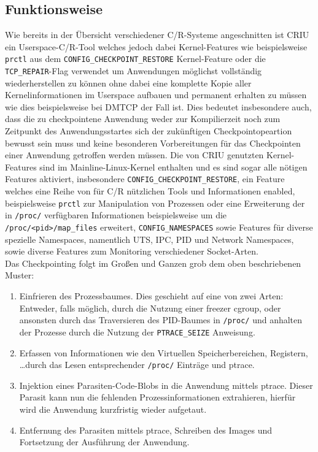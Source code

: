 \documentclass[a4paper]{article}
\begin{document}
\subsection{Funktionsweise}
Wie bereits in der Übersicht verschiedener C/R-Systeme angeschnitten ist CRIU ein Userspace-C/R-Tool welches jedoch dabei Kernel-Features wie beispielsweise \texttt{prctl} aus dem \texttt{CONFIG\_CHECKPOINT\_RESTORE} Kernel-Feature oder die \texttt{TCP\_REPAIR}-Flag verwendet um Anwendungen möglichst vollständig wiederherstellen zu können ohne dabei eine komplette Kopie aller Kernelinformationen im Userspace aufbauen und permanent erhalten zu müssen wie dies beispielsweise bei DMTCP der Fall ist. 
Dies bedeutet insbesondere auch, dass die zu checkpointene Anwendung weder zur Kompilierzeit noch zum Zeitpunkt des Anwendungsstartes sich der zukünftigen Checkpointopeartion bewusst sein muss und keine besonderen Vorbereitungen für das Checkpointen einer Anwendung getroffen werden müssen.
Die von CRIU genutzten Kernel-Features sind im Mainline-Linux-Kernel enthalten und es sind sogar alle nötigen Features aktiviert, insbesondere \texttt{CONFIG\_CHECKPOINT\_RESTORE}, ein Feature welches eine Reihe von für C/R nützlichen Tools und Informationen enabled, beispielsweise \texttt{prctl} zur Manipulation von Prozessen oder eine Erweiterung der in \texttt{/proc/} verfügbaren Informationen beispielsweise um die \texttt{/proc/<pid>/map\_files} erweitert, \texttt{CONFIG\_NAMESPACES} sowie Features für diverse spezielle Namespaces, namentlich UTS, IPC, PID und Network Namespaces, sowie diverse Features zum Monitoring verschiedener Socket-Arten.\\
Das Checkpointing folgt im Großen und Ganzen grob dem oben beschriebenen Muster:
\begin{enumerate}
    \item Einfrieren des Prozessbaumes. Dies geschieht auf eine von zwei Arten: Entweder, falls möglich, durch die Nutzung einer freezer cgroup, oder ansonsten durch das Traversieren des PID-Baumes in \texttt{/proc/} und anhalten der Prozesse durch die Nutzung der \texttt{PTRACE\_SEIZE} Anweisung.
    \item Erfassen von Informationen wie den Virtuellen Speicherbereichen, Registern, \dots durch das Lesen entsprechender \texttt{/proc/} Einträge und ptrace.
    \item Injektion eines Parasiten-Code-Blobs in die Anwendung mittels ptrace. Dieser Parasit kann nun die fehlenden Prozessinformationen extrahieren, hierfür wird die Anwendung kurzfristig wieder aufgetaut.
    \item Entfernung des Parasiten mittels ptrace, Schreiben des Images und Fortsetzung der Ausführung der Anwendung.
\end{enumerate}
\end{document}
